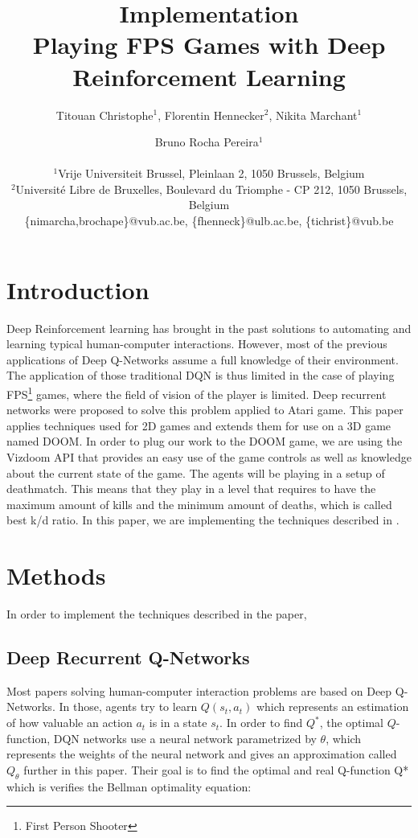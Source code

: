 \documentclass[letterpaper]{article}
\title{Implementation\\Playing FPS Games with Deep Reinforcement Learning}
\author{Titouan Christophe$^{1}$, Florentin Hennecker$^{2}$, Nikita Marchant$^{1}$ \and Bruno Rocha Pereira$^{1}$ \\
\mbox{}\\
$^1$Vrije Universiteit Brussel, Pleinlaan 2, 1050 Brussels, Belgium \\
$^2$Universit\'e Libre de Bruxelles, Boulevard du Triomphe - CP 212, 1050
Brussels, Belgium \\
\{nimarcha,brochape\}@vub.ac.be, \{fhenneck\}@ulb.ac.be, \{tichrist\}@vub.be}
\begin{document}
\maketitle

\begin{abstract}
\end{abstract}

\section{Introduction}
Deep Reinforcement learning has brought in the past solutions to automating and learning typical human-computer interactions. 
However, most of the previous applications of Deep Q-Networks assume a full knowledge of their environment. The application of those traditional DQN is thus limited in the case of playing FPS\footnote{First Person Shooter} games, where the field of vision of the player is limited. Deep recurrent networks were proposed to solve this problem \citep{Hausknecht2015} applied to Atari game. This paper applies techniques used for 2D games and extends them for use on a 3D game named DOOM.
In order to plug our work to the DOOM game, we are using the Vizdoom API \citep{Kempka2016} that provides an easy use of the game controls as well as knowledge about the current state of the game.
The agents will be playing in a setup of deathmatch. This means that they play in a level that requires to have the maximum amount of kills and the minimum amount of deaths, which is called best k/d ratio.
In this paper, we are implementing the techniques described in \citep{Lample2016}.
\section{Methods}
In order to implement the techniques described in the paper,

\subsection{Deep Recurrent Q-Networks}
Most papers solving human-computer interaction problems are based on Deep Q-Networks. In those, agents try to learn $Q(s_t,a_t)$ which represents an estimation of how valuable an action $a_t$ is in a state $s_t$. In order to find $Q^*$, the optimal $Q$-function, DQN networks use a neural network parametrized by $\theta$, which represents the weights of the neural network and gives an approximation called $Q_\theta$ further in this paper. Their goal is to find the optimal and real Q-function Q* which is verifies the Bellman optimality equation:
\end{document}
